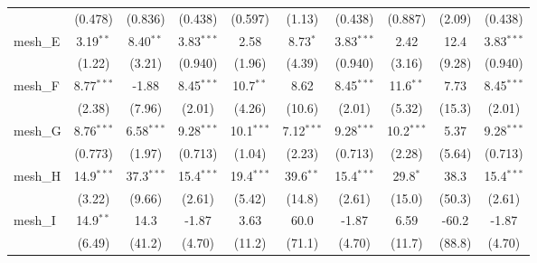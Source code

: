 \begin{tabular}{lccccccccc}
                                                               & (0.478)       & (0.836)       & (0.438)       & (0.597)      & (1.13)       & (0.438)       & (0.887)        & (2.09)         & (0.438)\\   
   mesh\_E                                                     & 3.19$^{**}$   & 8.40$^{**}$   & 3.83$^{***}$  & 2.58         & 8.73$^{*}$   & 3.83$^{***}$  & 2.42           & 12.4           & 3.83$^{***}$\\   
                                                               & (1.22)        & (3.21)        & (0.940)       & (1.96)       & (4.39)       & (0.940)       & (3.16)         & (9.28)         & (0.940)\\   
   mesh\_F                                                     & 8.77$^{***}$  & -1.88         & 8.45$^{***}$  & 10.7$^{**}$  & 8.62         & 8.45$^{***}$  & 11.6$^{**}$    & 7.73           & 8.45$^{***}$\\   
                                                               & (2.38)        & (7.96)        & (2.01)        & (4.26)       & (10.6)       & (2.01)        & (5.32)         & (15.3)         & (2.01)\\   
   mesh\_G                                                     & 8.76$^{***}$  & 6.58$^{***}$  & 9.28$^{***}$  & 10.1$^{***}$ & 7.12$^{***}$ & 9.28$^{***}$  & 10.2$^{***}$   & 5.37           & 9.28$^{***}$\\   
                                                               & (0.773)       & (1.97)        & (0.713)       & (1.04)       & (2.23)       & (0.713)       & (2.28)         & (5.64)         & (0.713)\\   
   mesh\_H                                                     & 14.9$^{***}$  & 37.3$^{***}$  & 15.4$^{***}$  & 19.4$^{***}$ & 39.6$^{**}$  & 15.4$^{***}$  & 29.8$^{*}$     & 38.3           & 15.4$^{***}$\\   
                                                               & (3.22)        & (9.66)        & (2.61)        & (5.42)       & (14.8)       & (2.61)        & (15.0)         & (50.3)         & (2.61)\\   
   mesh\_I                                                     & 14.9$^{**}$   & 14.3          & -1.87         & 3.63         & 60.0         & -1.87         & 6.59           & -60.2          & -1.87\\   
                                                               & (6.49)        & (41.2)        & (4.70)        & (11.2)       & (71.1)       & (4.70)        & (11.7)         & (88.8)         & (4.70)\\   

\end{tabular}
